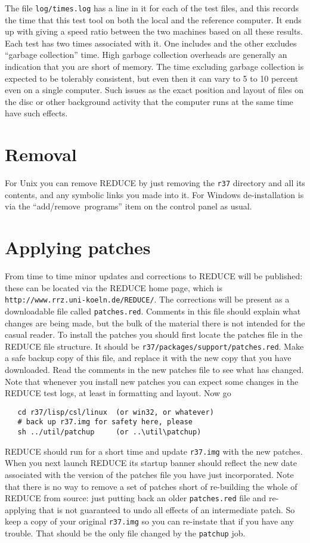 \documentclass[a4paper,11pt]{article}
\begin{document}
The file \verb+log/times.log+  has a line in it for each of the test files,
and this records the time that this test tool on both the local and the
reference computer. It ends up with giving a speed ratio between the
two machines based on all these results.  Each test has two times
associated with it. One includes and the other excludes ``garbage collection''
time. High garbage collection overheads are generally an indication that
you are short of memory. The time excluding garbage collection is expected
to be tolerably consistent, but even then it can vary to 5 to 10 percent
even on a single computer. Such issues as the exact position and layout
of files on the disc or other background activity that the computer runs at
the same time have such effects.

\section{Removal}
For Unix you can remove REDUCE by just removing the \verb+r37+ directory and
all its contents, and any symbolic links you made into it. For Windows
de-installation is via the ``add/remove~programs'' item on the control panel
as usual.

\section{Applying patches}
From time to time minor updates and corrections to REDUCE will be published:
these can be located via the REDUCE home page, which is
\verb+http://www.rrz.uni-koeln.de/REDUCE/+.  The corrections will be
present as a downloadable file called \verb+patches.red+. Comments in this
file should explain what changes are being made, but the bulk of the
material there is not intended for the casual reader.  To install the
patches you should first locate the patches file in the REDUCE file
structure. It should be \verb+r37/packages/support/patches.red+. Make
a safe backup copy of this file, and replace it with the new copy
that you have downloaded. Read the comments in the new patches file to
see what has changed. Note that whenever you install new patches you can
expect some changes in the REDUCE test logs, at least in formatting and
layout.  Now go
\begin{verbatim}
   cd r37/lisp/csl/linux  (or win32, or whatever)
   # back up r37.img for safety here, please
   sh ../util/patchup     (or ..\util\patchup)
\end{verbatim}
REDUCE should run for a short time and update \verb+r37.img+ with the
new patches. When you next launch REDUCE its startup banner should
reflect the new date associated with the version of the patches file
you have just incorporated.  Note that there is no way to remove a set of
patches short of re-building the whole of REDUCE from source: just
putting back an older \verb+patches.red+ file and re-applying that is not
guaranteed to undo all effects of an intermediate patch.  So keep a copy of
your original \verb+r37.img+ so you can re-instate that if you have any
trouble. That should be the only file changed by the \verb+patchup+ job.
\end{document}
